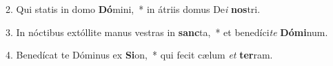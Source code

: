 2. Qui statis in domo \textbf{Dó}mini,~*  in átriis domus De\textit{i} \textbf{nos}tri.\

3. In nóctibus extóllite manus vestras in \textbf{sanc}ta,~*  et benedíci\textit{te} \textbf{Dó}\textbf{mi}num.\

4. Benedícat te Dóminus ex \textbf{Si}on,~*  qui fecit cælum \textit{et} \textbf{ter}ram.\


